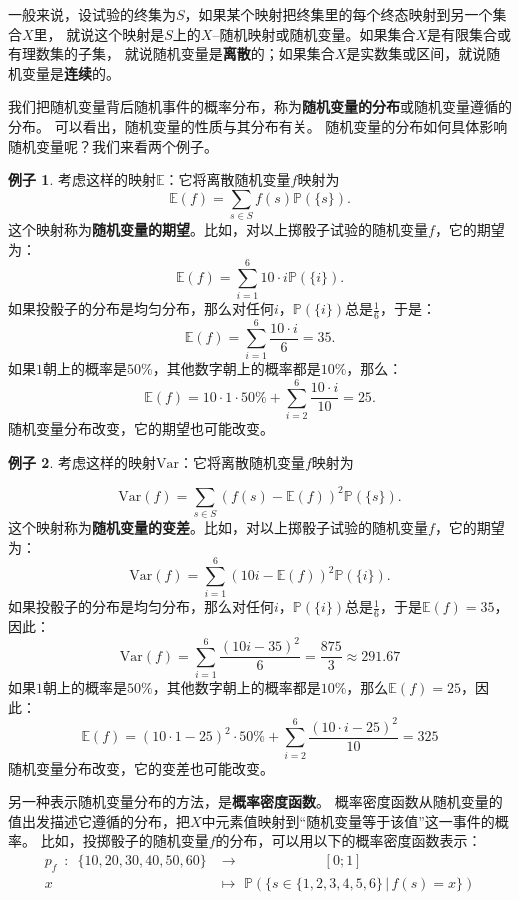 \documentclass[12pt,UTF8]{ctexbook}
\theoremstyle{definition}
\newtheorem{ex}{例子}[section]
\theoremstyle{plain}
\begin{document}
一般来说，设试验的终集为$S$，如果某个映射把终集里的每个终态映射到另一个集合$X$里，
就说这个映射是$S$上的$X$–随机映射或随机变量。如果集合$X$是有限集合或有理数集的子集，
就说随机变量是\textbf{离散}的；如果集合$X$是实数集或区间，就说随机变量是\textbf{连续}的。

我们把随机变量背后随机事件的概率分布，称为\textbf{随机变量的分布}或随机变量遵循的分布。
可以看出，随机变量的性质与其分布有关。
随机变量的分布如何具体影响随机变量呢？我们来看两个例子。
\begin{ex}
    考虑这样的映射$\mathbb{E}$：它将离散随机变量$f$映射为
    $$ \mathbb{E}(f) = \sum_{s\in S} f(s) \mathbb{P}(\{s\}).$$
    这个映射称为\textbf{随机变量的期望}。比如，对以上掷骰子试验的随机变量$f$，它的期望为：
    $$ \mathbb{E}(f) = \sum_{i=1}^6 10\cdot i \mathbb{P}(\{i\}).$$
    如果投骰子的分布是均匀分布，那么对任何$i$​，$\mathbb{P}(\{i\})$​总是$\frac{1}{6}$​，于是：
    $$ \mathbb{E}(f) = \sum_{i=1}^6 \frac{10\cdot i}{6} = 35. $$
    如果$1$朝上的概率是$50\%$，其他数字朝上的概率都是$10\%$​，那么：
    $$ \mathbb{E}(f) = 10\cdot 1\cdot 50\% + \sum_{i=2}^6 \frac{10\cdot i}{10} = 25. $$
    随机变量分布改变，它的期望也可能改变。
\end{ex}
\begin{ex}
    考虑这样的映射$\mathrm{Var}$：它将离散随机变量$f$映射为

    $$ \mathrm{Var}(f) = \sum_{s\in S} \left(f(s) - \mathbb{E}(f)\right)^2 \mathbb{P}(\{s\}).$$
    这个映射称为\textbf{随机变量的变差}。比如，对以上掷骰子试验的随机变量$f$，它的期望为：
    $$ \mathrm{Var}(f) = \sum_{i=1}^6 \left(10i - \mathbb{E}(f)\right)^2 \mathbb{P}(\{i\}).$$
    如果投骰子的分布是均匀分布，那么对任何$i$，$\mathbb{P}(\{i\})$总是$\frac{1}{6}$，于是$\mathbb{E}(f) = 35$，因此：
    $$\mathrm{Var}(f) = \sum_{i=1}^6 \frac{\left(10i - 35\right)^2}{6} = \frac{875}{3} \approx 291.67$$    
    如果$1$朝上的概率是$50\%$，其他数字朝上的概率都是$10\%$，那么$\mathbb{E}(f) = 25$，因此：    
    $$ \mathbb{E}(f) = (10\cdot 1 - 25)^2\cdot 50\% + \sum_{i=2}^6 \frac{(10\cdot i - 25)^2}{10} = 325 $$
    随机变量分布改变，它的变差也可能改变。
\end{ex}

另一种表示随机变量分布的方法，是\textbf{概率密度函数}。
概率密度函数从随机变量的值出发描述它遵循的分布，把$X$中元素值映射到“随机变量等于该值”这一事件的概率。
比如，投掷骰子的随机变量$f$的分布，可以用以下的概率密度函数表示：
\begin{align*}
p_f \,\,\, : \,\,\,  \{10,20,30,40,50,60\} &\rightarrow \qquad\qquad\qquad [0; 1]  \\
  x\qquad\qquad &\mapsto \,\, \mathbb{P}(\{s \in \{1,2,3,4,5,6\} \,|\, f(s) = x\})  
\end{align*}
\end{document}
